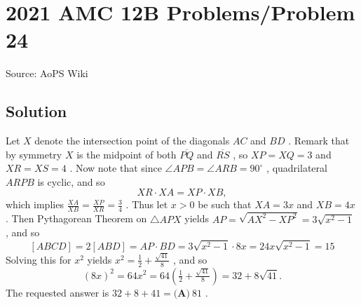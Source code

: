\documentclass[12pt]{article}
\begin{document}
\section*{{2021 AMC 12B Problems/Problem 24}}
Source: AoPS Wiki

\subsection*{Solution}
Let $X$ denote the intersection point of the diagonals $AC$ and $BD$ . Remark that by symmetry $X$ is the midpoint of both $\overline{PQ}$ and $\overline{RS}$ , so $XP = XQ = 3$ and $XR = XS = 4$ . Now note that since $\angle APB = \angle ARB = 90^\circ$ , quadrilateral $ARPB$ is cyclic, and so \[XR\cdot XA = XP\cdot XB,\] which implies $\tfrac{XA}{XB} = \tfrac{XP}{XR} = \tfrac34$ . Thus let $x> 0$ be such that $XA = 3x$ and $XB = 4x$ . Then Pythagorean Theorem on $\triangle APX$ yields $AP = \sqrt{AX^2 - XP^2} = 3\sqrt{x^2-1}$ , and so \[[ABCD] = 2[ABD] = AP\cdot BD = 3\sqrt{x^2-1}\cdot 8x = 24x\sqrt{x^2-1}=15\] Solving this for $x^2$ yields $x^2 = \tfrac12 + \tfrac{\sqrt{41}}8$ , and so \[(8x)^2 = 64x^2 = 64\left(\tfrac12 + \tfrac{\sqrt{41}}8\right) = 32 + 8\sqrt{41}.\] The requested answer is $32 + 8 + 41 = \boxed{\textbf{(A)} ~81}$ .
\end{document}
